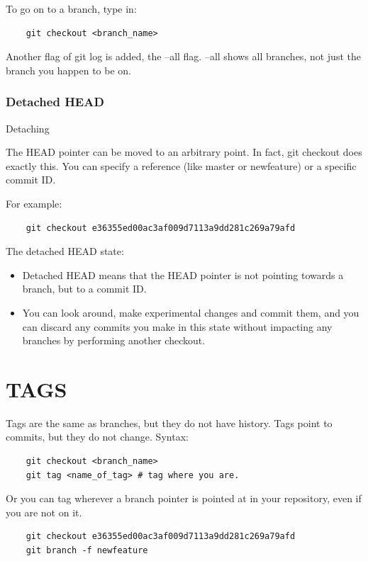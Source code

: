 \documentclass{report}
\begin{document}
To go on to a branch, type in: 

\begin{lstlisting} 
    git checkout <branch_name> 
\end{lstlisting} 

Another flag of git log is added, the --all flag. --all shows all branches, not just the branch you happen to be on. 

\subsection{Detached HEAD} 

Detaching 

The HEAD pointer can be moved to an arbitrary point. In fact, git checkout does exactly this. You can specify a reference (like master or newfeature) or a specific commit ID. 

For example: 
\begin{lstlisting}
    git checkout e36355ed00ac3af009d7113a9dd281c269a79afd
\end{lstlisting}

The detached HEAD state:

\begin{itemize}
    \item Detached HEAD means that the HEAD pointer is not pointing towards a branch, but to a commit ID.
    \item You can look around, make experimental changes and commit them, and you can discard any commits you make in this state without impacting any branches by performing another checkout.
\end{itemize}
 
\chapter{TAGS} 

Tags are the same as branches, but they do not have history. Tags point to commits, but they do not change. Syntax: 
\begin{lstlisting} 
    git checkout <branch_name> 
    git tag <name_of_tag> # tag where you are. 
\end{lstlisting} 
Or you can tag wherever a branch pointer is pointed at in your repository, even if you are not on it.

\begin{lstlisting} 
    git checkout e36355ed00ac3af009d7113a9dd281c269a79afd 
    git branch -f newfeature 
\end{lstlisting} 
\end{document}
